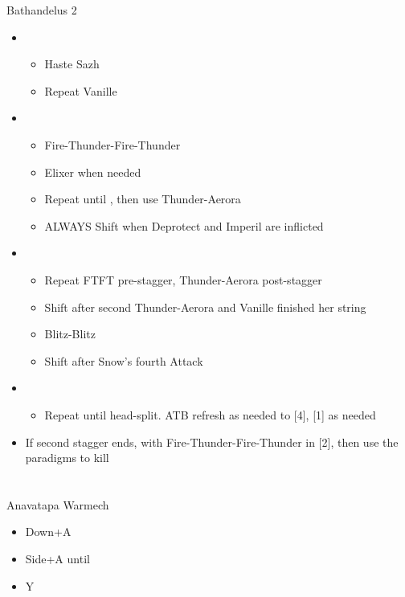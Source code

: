 \documentclass{report}
\begin{document}
\begin{battle}{Bathandelus 2}
\begin{multicols}{2}
\begin{itemize}
\begin{itemize}
    \end{itemize}
    \item \fifth
    \begin{itemize}
        \item Haste Sazh
        \item Repeat Vanille
    \end{itemize}
    \item \third
    \begin{itemize}
        \item Fire-Thunder-Fire-Thunder
        \item Elixer when needed
        \item Repeat until \stagger, then use Thunder-Aerora
        \item ALWAYS Shift when Deprotect and Imperil are inflicted
    \end{itemize}
    \item \second
    \begin{itemize}
        \item Repeat FTFT pre-stagger, Thunder-Aerora post-stagger
        \item Shift after second Thunder-Aerora and Vanille finished her string
    \end{itemize}\begin{itemize}
        \item Blitz-Blitz
        \item Shift after Snow's fourth Attack
    \end{itemize}
    \item \sixth
    \begin{itemize}
        \item Repeat until head-split. ATB refresh as needed to [4], [1] as needed
    \end{itemize}
    \item If second stagger ends, \stagger with Fire-Thunder-Fire-Thunder in [2], then use the \com paradigms to kill
\end{itemize}
\vfill\null
\end{multicols}
\end{battle}

\chapter{}

\begin{battle}{Anavatapa Warmech}
\begin{itemize}
    \item Down+A
    \item Side+A until \stagger
    \item Y
\end{itemize}
\end{battle}
\end{document}
